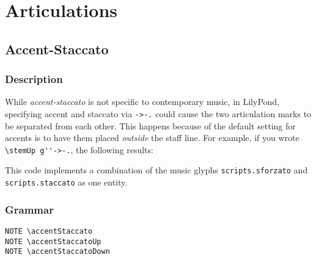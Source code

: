 

\chapter {Articulations}

\label{sec:articulations_accent-staccato}

\section {Accent-Staccato}
\hfill
{}
\hfill

\subsection{Description}
While \textit{accent-staccato} is not specific to contemporary music, in LilyPond, specifying accent and staccato via \verb|->-.| could cause the two articulation marks to be separated from each other. This happens because of the default setting for accents is to have them placed \textit{outside} the staff line. For example, if you wrote \verb|\stemUp g''->-.|, the following results:


This code implements a combination of the music glyphs \verb|scripts.sforzato| and \verb|scripts.staccato| as one entity.

\subsection{Grammar}
\begin{verbatim}
NOTE \accentStaccato
NOTE \accentStaccatoUp
NOTE \accentStaccatoDown
\end{verbatim}

